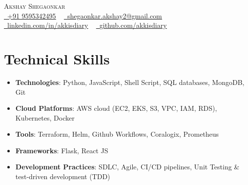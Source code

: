 \documentclass[letterpaper,11pt]{article}
\newcommand{\resumeItem}[1]{
    \item
        \small{#1}
}
\newcommand{\resumeItemListStart}{\begin{itemize}}
\newcommand{\resumeItemListEnd}{\end{itemize}}
\begin{document}
\begin{center}
    {\Huge\scshape Akshay Shegaonkar} \\ \vspace{1pt}
    \href{tel:+919595342495}{\raisebox{-0.2\height}\faPhone\ \underline{+91 9595342495}} ~
    \href{mailto:shegaonkar.akshay2@gmail.com}{\raisebox{-0.2\height}\faEnvelope\  \underline{shegaonkar.akshay2@gmail.com}} ~
    \href{https://www.linkedin.com/in/akkisdiary/}{\raisebox{-0.2\height}\faLinkedin\ \underline{linkedin.com/in/akkisdiary}} ~
    \href{https://github.com/akkisdiary}{\raisebox{-0.2\height}\faGithub\ \underline{github.com/akkisdiary}}
\end{center}

\section{Technical Skills}
\resumeItemListStart
    \resumeItem
    {\textbf{Technologies}: Python, JavaScript, Shell Script, SQL databases, MongoDB, Git}
    \resumeItem
    {\textbf{Cloud Platforms}: AWS cloud (EC2, EKS, S3, VPC, IAM, RDS), Kubernetes, Docker}
    \resumeItem
    {\textbf{Tools}: Terraform, Helm, Github Workflows, Coralogix, Prometheus}
    \resumeItem
    {\textbf{Frameworks}: Flask, React JS}
    \resumeItem
    {\textbf{Development Practices}: SDLC, Agile, CI/CD pipelines, Unit Testing \& test-driven development (TDD)}
\resumeItemListEnd


\end{document}
